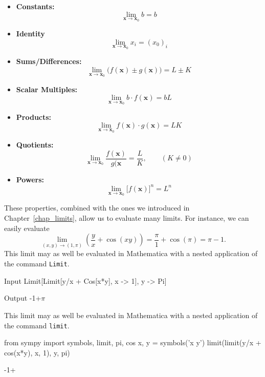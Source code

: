 \begin{itemize}
\item \textbf{Constants:} $$\displaystyle \lim_{\mathbf{x}\to \mathbf{x}_0} b = b$$
\item	\textbf{Identity }	$$\displaystyle \lim_{\mathbf{x}\to \mathbf{x}_0} x_i = (x_{0})_i$$
\item	\textbf{Sums/Differences:} $$\displaystyle \lim_{\mathbf{x}\to \mathbf{x}_0}\big(f(\mathbf{x})\pm g(\mathbf{x})\big) = L\pm K$$
\item	\textbf{Scalar Multiples:}	$$\displaystyle \lim_{\mathbf{x}\to \mathbf{x}_0} b\cdot f(\mathbf{x}) = bL$$
\item	\textbf{Products:}	$$\displaystyle \lim_{\mathbf{x}\to \mathbf{x}_0} f(\mathbf{x})\cdot g(\mathbf{x}) = LK$$
\item	\textbf{Quotients:} $$\displaystyle \lim_{\mathbf{x}\to \mathbf{x}_0} \dfrac{f(\mathbf{x})}{g(\mathbf{x}} = \dfrac{L}{K},\qquad (K\neq 0)$$
\item	\textbf{Powers:} 	$$\displaystyle \lim_{\mathbf{x}\to \mathbf{x}_0} \big[f(\mathbf{x})\big]^n = L^n$$

\end{itemize}
\fi


These properties, combined with the ones we introduced in Chapter~\ref{chap_limits}, allow us to evaluate many limits. For instance, we can easily evaluate
$$
	\lim_{(x,y)\to (1,\pi)} \left(\frac yx + \cos(xy)\right)  = \frac\pi{1}+\cos (\pi) = \pi -1.
$$
\ifmathematica
This limit may as well be evaluated in Mathematica with a nested application of the command \lstinline{Limit}.
	\begin{mdframed}[default,backgroundcolor=gray!40,roundcorner=8pt]
\begin{mmaCell}[morefunctionlocal={x,y}]{Input}
  Limit[Limit[y/x + Cos[x*y], x -> 1], y -> Pi]
\end{mmaCell}

\begin{mmaCell}{Output}
  -1+\(\pi\)
\end{mmaCell}
\end{mdframed}
\fi

\ifpython
This limit may as well be evaluated in Mathematica with a nested application of the command \lstinline{limit}.
\begin{pyin}
from sympy import symbols, limit, pi, cos
x, y = symbols('x y')
limit(limit(y/x + cos(x*y), x, 1), y, pi)
\end{pyin}
\begin{pyout}
-1+\pi
\end{pyout}
\fi


